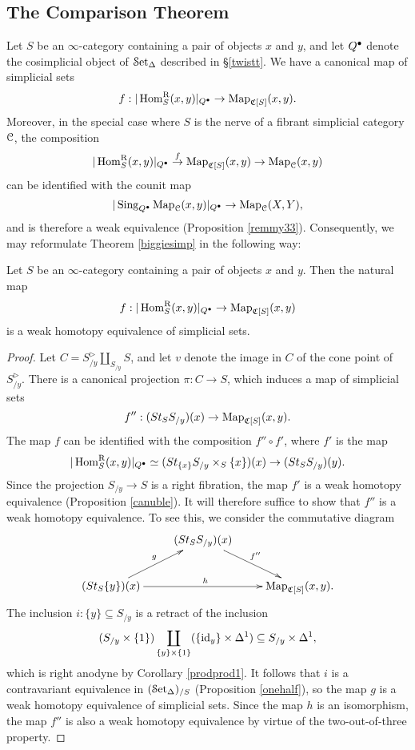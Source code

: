 \subsection{The Comparison Theorem}\label{compp2}

Let $S$ be an $\infty$-category containing a pair of objects $x$ and $y$, and let
$Q^{\bullet}$ denote the cosimplicial object of $\operatorname{\mathcal{S}et_{\Delta}}$ described in \S \ref{twistt}. 
We have a canonical map of simplicial sets
$$ f: | \operatorname{Hom}^{\operatorname{R}}_{S}(x,y) |_{Q^{\bullet}} \rightarrow \operatorname{{Map}}_{\operatorname{\mathfrak{C}}[S]}(x,y).$$
Moreover, in the special case where $S$ is the nerve of a fibrant simplicial category $\operatorname{\mathcal{C}}$, the composition
$$ | \operatorname{Hom}^{\operatorname{R}}_{S}(x,y) |_{Q^{\bullet}} \stackrel{f}{\rightarrow} \operatorname{{Map}}_{\operatorname{\mathfrak{C}}[S]}(x,y) \rightarrow \operatorname{{Map}}_{\operatorname{\mathcal{C}}}(x,y)$$ can be identified with
the counit map 
$$ | \operatorname{Sing}_{Q^{\bullet}} \operatorname{{Map}}_{\operatorname{\mathcal{C}}}(x,y) |_{Q^{\bullet}} \rightarrow \operatorname{{Map}}_{\operatorname{\mathcal{C}}}(X,Y),$$
and is therefore a weak equivalence (Proposition \ref{remmy33}). 
Consequently, we may reformulate Theorem \ref{biggiesimp} in the following way:

\begin{proposition}\label{wiretrack}
Let $S$ be an $\infty$-category containing a pair of objects $x$ and $y$. Then the natural map
$$ f: | \operatorname{Hom}^{\operatorname{R}}_{S}(x,y) |_{Q^{\bullet}} \rightarrow \operatorname{{Map}}_{\operatorname{\mathfrak{C}}[S]}(x,y)$$
is a weak homotopy equivalence of simplicial sets. 
\end{proposition}

\begin{proof}
Let $C = S_{/y}^{\triangleright} \coprod_{ S_{/y} } S$, and let $v$ denote the image in $C$ of the cone point of $S_{/y}^{\triangleright}$. There is a canonical projection $\pi: C \rightarrow S$, which induces a map of simplicial sets 
$$f'': (St_{S} S_{/y})(x) \rightarrow \operatorname{{Map}}_{ \operatorname{\mathfrak{C}}[S]}(x,y).$$
The map $f$ can be identified with the composition $f'' \circ f'$, where
$f'$ is the map
$$ | \operatorname{Hom}^{\operatorname{R}}_{S}(x,y)|_{Q^{\bullet}} \simeq 
(St_{ \{x\} } S_{/y} \times_{S} \{x\})(x) \rightarrow (St_{S} S_{/y})(y).$$
Since the projection $S_{/y} \rightarrow S$ is a right fibration, the map
$f'$ is a weak homotopy equivalence (Proposition \ref{canuble}). It will therefore suffice to show that
$f''$ is a weak homotopy equivalence. To see this, we consider the commutative diagram
$$ \xymatrix{ & (\St_{S} S_{/y})(x) \ar[dr]^{f''} & \\
(\St_{S} \{y\})(x) \ar[ur]^{g} \ar[rr]^{h} & & \bHom_{ \sCoNerve[S]}(x,y). }$$
The inclusion $i: \{ y\} \subseteq S_{/y}$ is a retract of the inclusion
$$ (S_{/y} \times \{1\} ) \coprod_{ \{ y \} \times \{1\} }
( \{ \operatorname{id}_{y} \} \times \Delta^1) \subseteq S_{/y} \times \Delta^1,$$
which is right anodyne by Corollary \ref{prodprod1}. It follows that $i$ is a contravariant equivalence
in $(\operatorname{\mathcal{S}et_{\Delta}})_{/S}$ (Proposition \ref{onehalf}), so the map $g$ is a weak homotopy equivalence of simplicial sets. Since the map $h$ is an isomorphism, the map $f''$ is also a weak homotopy equivalence by virtue of the two-out-of-three property.
\end{proof}

